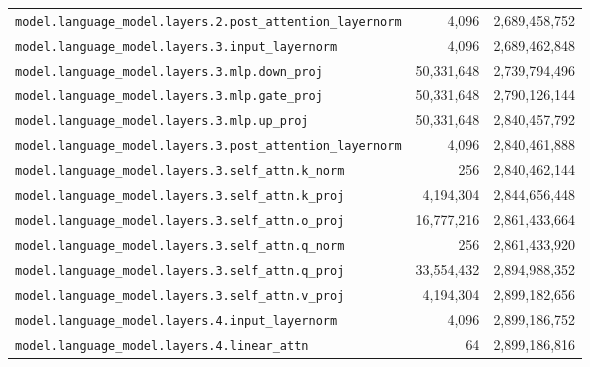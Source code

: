\documentclass[10pt,a4paper]{article}
\theoremstyle{definition}
\begin{document}
\begin{appendices}
\begin{longtable}{p{9.5cm}rr}
\texttt{model.\allowbreak{}language\_model.\allowbreak{}layers.\allowbreak{}2.\allowbreak{}post\_attention\_layernorm} & 4,096 & 2,689,458,752 \\
\texttt{model.\allowbreak{}language\_model.\allowbreak{}layers.\allowbreak{}3.\allowbreak{}input\_layernorm} & 4,096 & 2,689,462,848 \\
\texttt{model.\allowbreak{}language\_model.\allowbreak{}layers.\allowbreak{}3.\allowbreak{}mlp.\allowbreak{}down\_proj} & 50,331,648 & 2,739,794,496 \\
\texttt{model.\allowbreak{}language\_model.\allowbreak{}layers.\allowbreak{}3.\allowbreak{}mlp.\allowbreak{}gate\_proj} & 50,331,648 & 2,790,126,144 \\
\texttt{model.\allowbreak{}language\_model.\allowbreak{}layers.\allowbreak{}3.\allowbreak{}mlp.\allowbreak{}up\_proj} & 50,331,648 & 2,840,457,792 \\
\texttt{model.\allowbreak{}language\_model.\allowbreak{}layers.\allowbreak{}3.\allowbreak{}post\_attention\_layernorm} & 4,096 & 2,840,461,888 \\
\texttt{model.\allowbreak{}language\_model.\allowbreak{}layers.\allowbreak{}3.\allowbreak{}self\_attn.\allowbreak{}k\_norm} & 256 & 2,840,462,144 \\
\texttt{model.\allowbreak{}language\_model.\allowbreak{}layers.\allowbreak{}3.\allowbreak{}self\_attn.\allowbreak{}k\_proj} & 4,194,304 & 2,844,656,448 \\
\texttt{model.\allowbreak{}language\_model.\allowbreak{}layers.\allowbreak{}3.\allowbreak{}self\_attn.\allowbreak{}o\_proj} & 16,777,216 & 2,861,433,664 \\
\texttt{model.\allowbreak{}language\_model.\allowbreak{}layers.\allowbreak{}3.\allowbreak{}self\_attn.\allowbreak{}q\_norm} & 256 & 2,861,433,920 \\
\texttt{model.\allowbreak{}language\_model.\allowbreak{}layers.\allowbreak{}3.\allowbreak{}self\_attn.\allowbreak{}q\_proj} & 33,554,432 & 2,894,988,352 \\
\texttt{model.\allowbreak{}language\_model.\allowbreak{}layers.\allowbreak{}3.\allowbreak{}self\_attn.\allowbreak{}v\_proj} & 4,194,304 & 2,899,182,656 \\
\texttt{model.\allowbreak{}language\_model.\allowbreak{}layers.\allowbreak{}4.\allowbreak{}input\_layernorm} & 4,096 & 2,899,186,752 \\
\texttt{model.\allowbreak{}language\_model.\allowbreak{}layers.\allowbreak{}4.\allowbreak{}linear\_attn} & 64 & 2,899,186,816 \\

\end{longtable}
\end{appendices}
\end{document}
